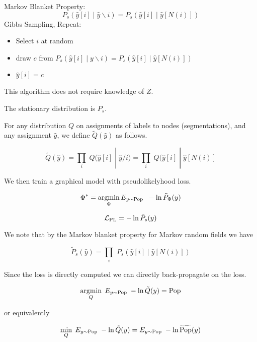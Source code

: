 {

Markov Blanket Property:
{\color{red} $$P_s(\hat{y}[i] \;|\;\hat{y} \backslash i) = P_s(\hat{y}[i] \;|\; \hat{y}[N(i)])$$}
\vfill
Gibbs Sampling, Repeat:

\begin{itemize}
\item   Select $i$ at random

\item {\color{red} draw $c$ from $P_s(\hat{y}[i]\;|\;y\backslash i) = P_s(\hat{y}[i] \;|\;\hat{y}[N(i)])$}

\item $\hat{y}[i] = c$
\end{itemize}

\vfill
This algorithm does not require knowledge of $Z$.

\vfill
The stationary distribution is $P_s$.


For any distribution {\color{red} $Q$} on assignments of labels to nodes (segmentations), and any assignment {\color{red} $\hat{y}$},
we define {\color{red} $\tilde{Q}(\hat{y})$} as follows.

{\color{red} $$\tilde{Q}(\hat{y}) = \prod_i\;Q(\hat{y}[i]\;|\; \hat{y}/i) = \prod_i\;Q(\hat{y}[i]\;|\; \hat{y}[N(i)]$$}

We then train a graphical model with pseudolikelyhood loss.

{\color{red} $$\Phi^* = \operatorname*{argmin}_\Phi E_{y \sim \mathrm{Pop}}\;\;-\ln \tilde{P}_\Phi(y)$$}



{\color{red} $${\cal L}_{\mathrm{PL}} = - \ln \tilde{P}_s(y)$$}

\vfill
We note that by the Markov blanket property for Markov random fields we have

{\color{red} $$\tilde{P}_s(\hat{y}) = \prod_i\;P_s(\hat{y}[i]\;|\; \hat{y}[N(i)])$$}

\vfill
Since the loss is directly computed we can directly back-propagate on the loss.






{\color{red} $$\operatorname*{argmin}_Q \; E_{y \sim \mathrm{Pop}} \;-\ln \tilde{Q}(y) = \mathrm{Pop}$$}

\vfill
or equivalently


\vfill
{\color{red} $$\min_Q \; E_{y \sim \mathrm{Pop}} \;-\ln \tilde{Q}(y) = E_{y \sim \mathrm{Pop}}\;-\ln \widetilde{\mathrm{Pop}}(y)$$}
\vfill


}

